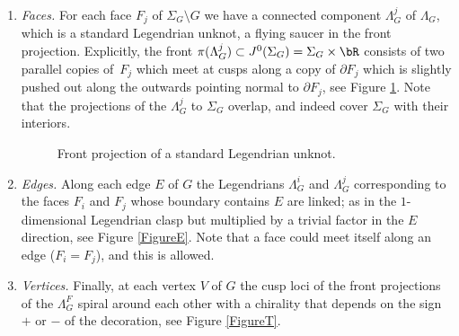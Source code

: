 \begin{enumerate}
\item
\textit{Faces.} For each face $F_j$ of $\Sigma_G \setminus G$ we have a connected component $\Lambda^j_G$ of $\Lambda_G$, which is a standard Legendrian unknot, \ie a flying saucer in the front projection. Explicitly, the front $\pi(\Lambda^j_G) \subset J^0(\Sigma_G)=\Sigma_G \times \bR$ consists of two parallel copies of~$F_j$ which meet at cusps along a copy of $\partial F_j$ which is slightly pushed out along the outwards pointing normal to $\partial F_j$, see Figure \ref{FigureLens}. Note that the projections of the $\Lambda^j_G$ to $\Sigma_G$ overlap, and indeed cover $\Sigma_G$ with their interiors.

\begin{figure}[htbp]
\begin{center}
\caption{\smaller Front projection of a standard Legendrian unknot.}
\label{FigureLens}
\end{center}
\end{figure}

\item
\textit{Edges.} Along each edge $E$ of $G$ the Legendrians $\Lambda^{i}_G$ and $\Lambda^{j}_G$ corresponding to the faces $F_i$ and $F_j$ whose boundary contains $E$ are linked; as in the $1$-dimensional Legendrian clasp but multiplied by a trivial factor in the $E$ direction, see Figure \ref{FigureE}. Note that a face could meet itself along an edge (\ie $F_i=F_j$), and this is allowed.

\item
\textit{Vertices.} Finally, at each vertex $V$ of $G$ the cusp loci of the front projections of the $\Lambda^F_G$ spiral around each other with a chirality that depends on the sign $+$ or $-$ of the decoration, see Figure \ref{FigureT}.
\end{enumerate}

